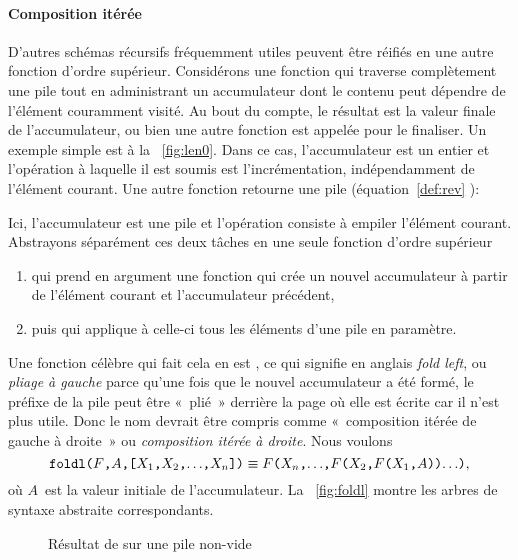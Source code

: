 \paragraph{Composition itérée}
\label{par:folds}

D'autres schémas récursifs fréquemment utiles peuvent être réifiés en
une autre fonction d'ordre supérieur. Considérons une fonction qui
traverse complètement une pile tout en administrant un accumulateur
dont le contenu peut dépendre de l'élément couramment visité. Au bout
du compte, le résultat est la valeur finale de l'accumulateur, ou bien
une autre fonction est appelée pour le finaliser. Un exemple simple
est  à la \fig~\vref{fig:len0}. Dans ce cas,
l'accumulateur est un entier et l'opération à laquelle il est soumis
est l'incrémentation, indépendamment de l'élément courant. Une autre
fonction retourne une pile (équation~\eqref{def:rev}
):

Ici, l'accumulateur est une pile et l'opération consiste à empiler
l'élément courant. Abstrayons séparément ces deux tâches en une seule
fonction d'ordre supérieur
\begin{enumerate}

  \item qui prend en argument une fonction qui crée un nouvel
  accumulateur à partir de l'élément courant et l'accumulateur
  précédent,

  \item puis qui applique à celle-ci tous les éléments d'une pile en
  paramètre.

\end{enumerate}
Une fonction célèbre qui fait cela en \Erlang est ,
ce qui signifie en anglais \emph{fold left}, ou \emph{pliage à gauche}
parce qu'une fois que le nouvel accumulateur a été formé, le préfixe
de la pile peut être «~plié~» derrière la page où elle est écrite car il
n'est plus utile. Donc le nom devrait être compris comme «~composition
itérée de gauche à droite~» ou \emph{composition itérée à droite}. Nous
voulons
\begin{equation*}
\texttt{foldl(\(F\),\(A\),[\(X_1\),\(X_2\),\(\ldots\),\(X_{n}\)])}
\equiv
\texttt{\(F\)(\(X_{n}\),\(\ldots\),\(F\)(\(X_2\),\(F\)(\(X_1\),\(A\)))\(\ldots\))},
\end{equation*}
où \(A\)~est la valeur initiale de l'accumulateur. La
\fig~\vref{fig:foldl} montre les arbres de syntaxe abstraite
correspondants.
\begin{figure}
\centering
{}
\qquad
{}
\caption{Résultat de  sur une pile non-vide
\label{fig:foldl}}
\end{figure}
